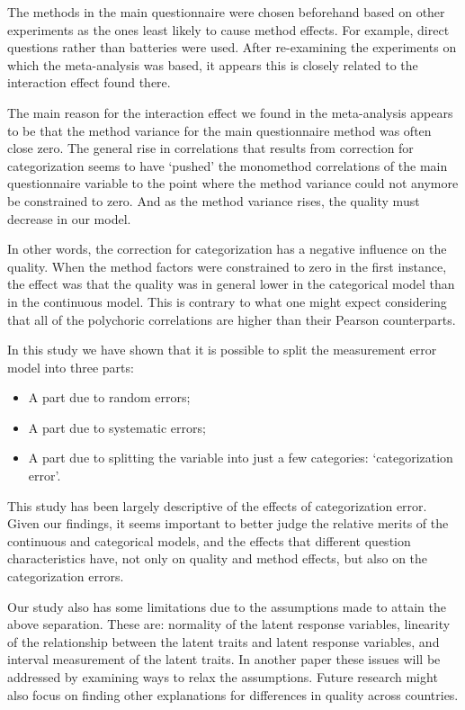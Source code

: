 \documentclass[a4paper,12pt]{article}
\begin{document}
The methods in the main questionnaire were chosen beforehand based on other experiments as the ones least likely to cause method effects. For example, direct questions rather than batteries were used. After re-examining the experiments on which the meta-analysis was based, it appears this is closely related to the interaction effect found there.

The main reason for the interaction effect we found in the meta-analysis appears to be that the method variance for the main questionnaire method was often close zero.  The general rise in correlations that results from correction for categorization seems to have `pushed' the monomethod correlations of the main questionnaire variable to the point where the method variance could not anymore be constrained to zero. And as the method variance rises, the quality must decrease in our model.


In other words, the correction for categorization has a negative influence on the quality. When the method factors were constrained to zero in the first instance, the effect was that the quality was in general lower in the categorical model than in the continuous model. This is contrary to what one might expect considering that all of the polychoric correlations are higher than their Pearson counterparts.

In this study we have shown that it is possible to split the measurement error model into
three parts:
\begin{itemize}
     \item A part due to random errors;
     \item A part due to systematic errors;
     \item A part due to splitting the variable into just a few categories: `categorization error'.
\end{itemize}

This study has been largely descriptive of the effects of categorization error. Given our findings, it seems important to better judge the relative merits of the continuous and categorical models, and the effects that different question characteristics have, not only on quality and method effects, but also on the categorization errors.

Our study also has some limitations due to the assumptions made to attain the above separation. These are: normality of the latent response variables, linearity of the relationship between the latent traits and latent response variables, and interval measurement of the latent traits. In another paper these issues will be addressed by examining ways to relax the assumptions.
Future research might also focus on finding other explanations for differences in quality across countries. 


\end{document}

